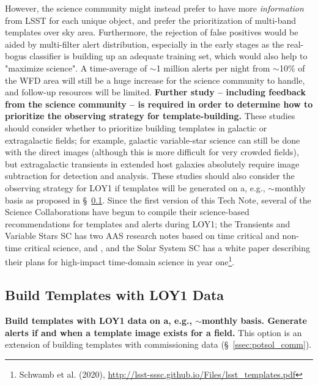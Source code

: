 \documentclass[DM,toc]{lsstdoc}
\begin{document}
However, the science community might instead prefer to have more {\em information} from LSST for each unique object, and prefer the prioritization of multi-band templates over sky area. 
Furthermore, the rejection of false positives would be aided by multi-filter alert distribution, especially in the early stages as the real-bogus classifier is building up an adequate training set, which would also help to "maximize science".
A time-average of $\sim$1 million alerts per night from $\sim$10\% of the WFD area will still be a huge increase for the science community to handle, and follow-up resources will be limited.
{\bf Further study -- including feedback from the science community -- is required in order to determine how to prioritize the observing strategy for template-building.}
These studies should consider whether to prioritize building templates in galactic or extragalactic fields; for example, galactic variable-star science can still be done with the direct images (although this is more difficult for very crowded fields), but extragalactic transients in extended host galaxies absolutely require image subtraction for detection and analysis.
These studies should also consider the observing strategy for LOY1 if templates will be generated on a, e.g., $\sim$monthly basis as proposed in \S~\ref{ssec:potsol_cont}.
Since the first version of this Tech Note, several of the Science Collaborations have begun to compile their science-based recommendations for templates and alerts during LOY1; the Transients and Variable Stars SC has two AAS research notes based on time critical and non-time critical science, \citet{2020RNAAS...4...41S} and \citet{2020RNAAS...4...40H}, and the Solar System SC has a white paper describing their plans for high-impact time-domain science in year one\footnote{Schwamb et al. (2020), \url{http://lsst-sssc.github.io/Files/lsst_templates.pdf}}.



\clearpage
\subsection{Build Templates with LOY1 Data}\label{ssec:potsol_cont}

{\bf Build templates with LOY1 data on a, e.g., $\sim$monthly basis. Generate alerts if and when a template image exists for a field.} This option is an extension of building templates with commissioning data (\S~\ref{ssec:potsol_comm}).
\end{document}
